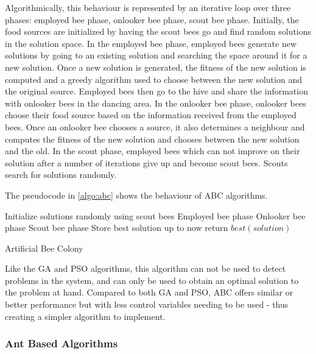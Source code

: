 Algorithmically, this behaviour is represented by an iterative loop over three phases: employed bee phase, onlooker bee phase, scout bee phase. Initially, the food sources are initialized by having the scout bees go and find random solutions in the solution space. In the employed bee phase, employed bees generate new solutions by going to an existing solution and searching the space around it for a new solution. Once a new solution is generated, the fitness of the new solution is computed and a greedy algorithm used to choose between the new solution and the original source. Employed bees then go to the hive and share the information with onlooker bees in the dancing area. In the onlooker bee phase, onlooker bees choose their food source based on the information received from the employed bees. Once an onlooker bee chooses a source, it also determines a neighbour and computes the fitness of the new solution and chooses between the new solution and the old. In the scout phase, employed bees which can not improve on their solution after a number of iterations give up and become scout bees. Scouts search for solutions randomly.

The pseudocode in \ref{algo:abc} shows the behaviour of ABC algorithms.

\begin{algorithm}
\begin{algorithmic}
\State Initialize solutions randomly using scout bees
	\State Employed bee phase
	\State Onlooker bee phase
	\State Scout bee phase
	\State Store best solution up to now
\EndWhile
\State return $best(solution)$
\end{algorithmic}
\caption{Artificial Bee Colony}\label{algo:abc}
\end{algorithm}

Like the GA and PSO algorithms, this algorithm can not be used to detect problems in the system, and can only be used to obtain an optimal solution to the problem at hand. Compared to both GA and PSO, ABC offers similar or better performance but with less control variables needing to be used - thus creating a simpler algorithm to implement.

\subsubsection{Ant Based Algorithms}

